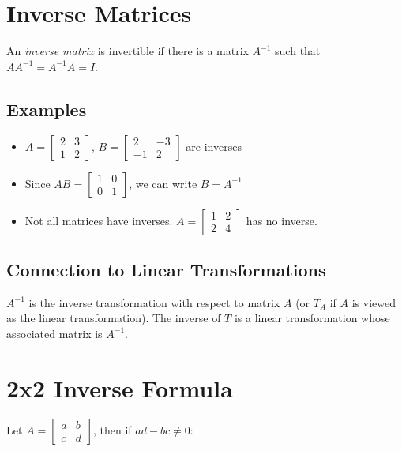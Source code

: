\documentclass[12pt,a4paper]{article}
\begin{document}
\section{Inverse Matrices}

An \textit{inverse matrix} is invertible if there is a matrix $A^{-1}$ such that $AA^{-1} = A^{-1}A = I$.

\subsection{Examples}

\begin{itemize}
    \item $A = \begin{bmatrix} 2 & 3 \\ 1 & 2 \end{bmatrix}$, $B = \begin{bmatrix} 2 & -3 \\ -1 & 2 \end{bmatrix}$ are inverses
    \item Since $AB = \begin{bmatrix} 1 & 0 \\ 0 & 1 \end{bmatrix}$, we can write $B = A^{-1}$
    \item Not all matrices have inverses. $A = \begin{bmatrix} 1 & 2 \\ 2 & 4 \end{bmatrix}$ has no inverse.
\end{itemize}

\subsection{Connection to Linear Transformations}

$A^{-1}$ is the inverse transformation with respect to matrix $A$ (or $T_A$ if $A$ is viewed as the linear transformation). The inverse of $T$ is a linear transformation whose associated matrix is $A^{-1}$.

\section{2x2 Inverse Formula}

Let $A = \begin{bmatrix} a & b \\ c & d \end{bmatrix}$, then if $ad-bc \neq 0$:
\end{document}
